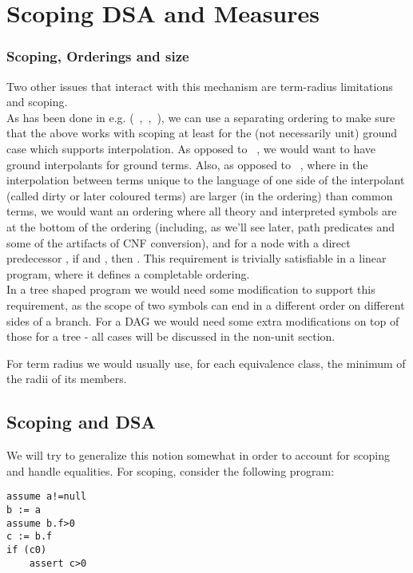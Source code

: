 \chapter{Scoping DSA and Measures}

\subsection{Scoping, Orderings and size}

Two other issues that interact with this mechanism are term-radius limitations and scoping.\\
As has been done in e.g. (~\cite{McMillan08},~\cite{BachmairGanzingerWaldmann92},~\cite{KovacsVoronkov09}), we can use a separating ordering to make sure that the above works with scoping at least for the (not necessarily unit) ground case which supports interpolation. 
As opposed to ~\cite{McMillan08}, we would want to have ground interpolants for ground terms.
Also, as opposed to ~\cite{KovacsVoronkov09}, where in the interpolation between  terms unique to the language of one side of the interpolant (called dirty or later coloured terms) are larger (in the ordering) than common terms, we would want an ordering where all theory and interpreted symbols are at the bottom of the ordering (including, as we'll see later, path predicates and some of the artifacts of CNF conversion), and for a node  with a direct predecessor , 
if  and , then .
This requirement is trivially satisfiable in a linear program, where it defines a completable ordering.\\
In a tree shaped program we would need some modification to support this requirement, as the scope of two symbols can end in a different order on different sides of a branch.
For a DAG we would need some extra modifications on top of those for a tree - all cases will be discussed in the non-unit section. 

For term radius we would usually use, for each equivalence class, the minimum of the radii of its members.


\section{Scoping and DSA}
We will try to generalize this notion somewhat in order to account for scoping and handle equalities.
For scoping, consider the following program:
\begin{lstlisting}[caption=scoping heap read property,label=snippet3.5.1]
assume a!=null
b := a
assume b.f>0
c := b.f
if (c0)
	assert c>0
\end{lstlisting}

